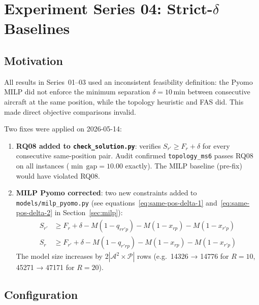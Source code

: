 \newpage
\section{Experiment Series 04: Strict-$\delta$ Baselines}
\label{sec:exp04}

\subsection{Motivation}

All results in Series~01--03 used an inconsistent feasibility definition:
the Pyomo MILP did not enforce the minimum separation $\delta=10$\,min between
consecutive aircraft at the same position, while the topology heuristic and
FAS did.  This made direct objective comparisons invalid.

Two fixes were applied on 2026-05-14:

\begin{enumerate}[noitemsep]
    \item \textbf{RQ08 added to \texttt{check\_solution.py}}: verifies
          $S_{r'} \geq F_r + \delta$ for every consecutive same-position pair.
          Audit confirmed \texttt{topology\_ms6} passes RQ08 on all instances
          ($\min\,\text{gap} = 10.00$ exactly).  The MILP baseline (pre-fix)
          would have violated RQ08.
    \item \textbf{MILP Pyomo corrected}: two new constraints added to
          \texttt{models/milp\_pyomo.py} (see equations~\eqref{eq:same-pos-delta-1}
          and~\eqref{eq:same-pos-delta-2} in Section~\ref{sec:milp}):
          \begin{align*}
              S_{r'} &\geq F_r + \delta - M(1-q_{rr'p}) - M(1-x_{rp}) - M(1-x_{r'p}) \\
              S_r    &\geq F_{r'} + \delta - M(1-q_{r'rp}) - M(1-x_{rp}) - M(1-x_{r'p})
          \end{align*}
          The model size increases by $2|\mathcal{A}^2 \times \mathcal{P}|$
          rows (e.g.\ 14326 → 14776 for $R=10$, 45271 → 47171 for $R=20$).
\end{enumerate}

\subsection{Configuration}

